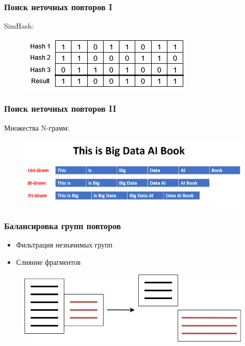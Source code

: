 \documentclass[aspectratio=169]{beamer}
\begin{document}
\begin{frame}\frametitle{Поиск неточных повторов I}
	SimHash:
	
	\begin{figure}
		\includegraphics[scale=0.7]{../diploma/pictures/Hash.png}
	\end{figure}
\end{frame}


\begin{frame}\frametitle{Поиск неточных повторов II}
	Множества N-грамм:
	\begin{figure}
		\includegraphics[scale=0.3]{../diploma/pictures/ngram.png}
	\end{figure}
\end{frame}


\begin{frame}\frametitle{Балансировка групп повторов}
	\begin{itemize}
		\item Фильтрация незначимых групп
		\item Слияние фрагментов
	\end{itemize}

	\begin{figure}
		\includegraphics[scale=0.3]{../diploma/pictures/Balance3.png}
	\end{figure}
\end{frame}
\end{document}
